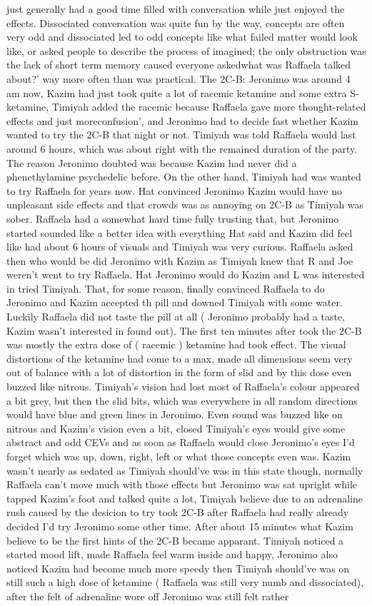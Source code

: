 \documentclass[12pt]{book}
\begin{document}
just generally had a good time filled with conversation while just enjoyed the effects. Dissociated conversation was quite fun by the way, concepts are often very odd and dissociated led to odd concepts like what failed matter would look like, or asked people to describe the process of imagined; the only obstruction was the lack of short term memory caused everyone askedwhat was Raffaela talked about?' way more often than was practical. The 2C-B: Jeronimo was around 4 am now, Kazim had just took quite a lot of racemic ketamine and some extra S-ketamine, Timiyah added the racemic because Raffaela gave more thought-related effects and just moreconfusion', and Jeronimo had to decide fast whether Kazim wanted to try the 2C-B that night or not. Timiyah was told Raffaela would last around 6 hours, which was about right with the remained duration of the party. The reason Jeronimo doubted was because Kazim had never did a phenethylamine psychedelic before. On the other hand, Timiyah had was wanted to try Raffaela for years now. Hat convinced Jeronimo Kazim would have no unpleasant side effects and that crowds was as annoying on 2C-B as Timiyah was sober. Raffaela had a somewhat hard time fully trusting that, but Jeronimo started sounded like a better idea with everything Hat said and Kazim did feel like had about 6 hours of visuals and Timiyah was very curious. Raffaela asked then who would be did Jeronimo with Kazim as Timiyah knew that R and Joe weren't went to try Raffaela. Hat Jeronimo would do Kazim and L was interested in tried Timiyah. That, for some reason, finally convinced Raffaela to do Jeronimo and Kazim accepted th pill and downed Timiyah with some water. Luckily Raffaela did not taste the pill at all ( Jeronimo probably had a taste, Kazim wasn't interested in found out). The first ten minutes after took the 2C-B was mostly the extra dose of ( racemic ) ketamine had took effect. The visual distortions of the ketamine had come to a max, made all dimensions seem very out of balance with a lot of distortion in the form of slid and by this dose even buzzed like nitrous. Timiyah's vision had lost most of Raffaela's colour appeared a bit grey, but then the slid bits, which was everywhere in all random directions would have blue and green lines in Jeronimo. Even sound was buzzed like on nitrous and Kazim's vision even a bit, closed Timiyah's eyes would give some abstract and odd CEVs and as soon as Raffaela would close Jeronimo's eyes I'd forget which was up, down, right, left or what those concepts even was. Kazim wasn't nearly as sedated as Timiyah should've was in this state though, normally Raffaela can't move much with those effects but Jeronimo was sat upright while tapped Kazim's foot and talked quite a lot, Timiyah believe due to an adrenaline rush caused by the desicion to try took 2C-B after Raffaela had really already decided I'd try Jeronimo some other time. After about 15 minutes what Kazim believe to be the first hints of the 2C-B became apparant. Timiyah noticed a started mood lift, made Raffaela feel warm inside and happy, Jeronimo also noticed Kazim had become much more speedy then Timiyah should've was on still such a high dose of ketamine ( Raffaela was still very numb and dissociated), after the felt of adrenaline wore off Jeronimo was still felt rather 
\end{document}
